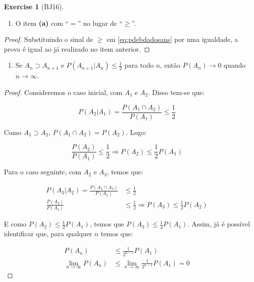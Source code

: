 \documentclass[
]{article}
\providecommand{\tightlist}{%
  \setlength{\itemsep}{0pt}\setlength{\parskip}{0pt}}
\theoremstyle{definition}
\theoremstyle{definition}
\theoremstyle{definition}
\newtheorem{exercise}{Exercise}[section]
\theoremstyle{definition}
\theoremstyle{remark}
\begin{document}
\begin{exercise}[BJ16]
\begin{enumerate}
\def\labelenumi{\alph{enumi})}
\setcounter{enumi}{1}
\tightlist
\item
  O item \textbf{(a)} com ``\(=\)'' no lugar de ``\(\ge\)''.
\end{enumerate}

\begin{proof}
Substituindo o sinal de \(\ge\) em \eqref{eq:pdebdadosans} por uma igualdade, a prova é igual ao já realizado no item anterior.
\end{proof}

\begin{enumerate}
\def\labelenumi{\alph{enumi})}
\setcounter{enumi}{2}
\tightlist
\item
  Se \(A_{n} \supset A_{n+1}\) e \(P(A_{n+1}|A_{n}) \le \frac{1}{2}\) para todo \(n\), então \(P(A_{n}) \to 0\) quando \(n \to \infty\).
\end{enumerate}

\begin{proof}
Consideremos o caso inicial, com \(A_{1}\) e \(A_{2}\). Disso tem-se que:

\begin{equation*}
P(A_{2}|A_{1}) = \frac{P(A_{1} \cap A_{2})}{P(A_{1})} \le \frac{1}{2}
\end{equation*}

Como \(A_{1} \supset A_{2}\), \(P(A_{1} \cap A_{2}) = P(A_{2})\). Logo:

\begin{equation*}
\frac{P(A_{2})}{P(A_{1})} \le \frac{1}{2} \Rightarrow P(A_{2}) \le \frac{1}{2}P(A_{1})
\end{equation*}

Para o caso seguinte, com \(A_{2}\) e \(A_{3}\), temos que:

\begin{align*}
P(A_{3}|A_{2}) = \frac{P(A_{2} \cap A_{3})}{P(A_{2})} &\le \frac{1}{2} \\
\frac{P(A_{3})}{P(A_{2})} &\le \frac{1}{2} \Rightarrow P(A_{3}) \le \frac{1}{2}P(A_{2})
\end{align*}

E como \(P(A_{2}) \le \frac{1}{2}P(A_{1})\), temos que \(P(A_{3}) \le \frac{1}{4}P(A_{1})\). Assim, já é possível identificar que, para qualquer \(n\) temos que:

\begin{align*}
P(A_{n}) &\le \frac{1}{2^{n-1}}P(A_{1}) \\
\lim_{n \to \infty}P(A_{n}) &\le \lim_{n \to \infty}\frac{1}{2^{n-1}}P(A_{1}) = 0
\end{align*}


\end{proof}
\end{exercise}
\end{document}
